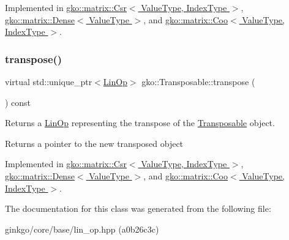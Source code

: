 Implemented in \hyperlink{classgko_1_1matrix_1_1Csr_a38820451af5424f18b767667f3067d72}{gko\+::matrix\+::\+Csr$<$ Value\+Type, Index\+Type $>$}, \hyperlink{classgko_1_1matrix_1_1Dense_a19890b1448497a50d57c16ed4c3bd820}{gko\+::matrix\+::\+Dense$<$ Value\+Type $>$}, and \hyperlink{classgko_1_1matrix_1_1Coo_ac1d91c524ca616b4c9e5f2a62f3f55ce}{gko\+::matrix\+::\+Coo$<$ Value\+Type, Index\+Type $>$}.

\mbox{\label{classgko_1_1Transposable_a5c6b778b71b47d53e0bda6ccf894d318}} 
\subsubsection{\texorpdfstring{transpose()}{transpose()}}
{\footnotesize\ttfamily virtual std\+::unique\+\_\+ptr$<$\hyperlink{classgko_1_1LinOp}{Lin\+Op}$>$ gko\+::\+Transposable\+::transpose (\begin{DoxyParamCaption}{ }\end{DoxyParamCaption}) const\hspace{0.3cm}{\ttfamily [pure virtual]}}



Returns a \hyperlink{classgko_1_1LinOp}{Lin\+Op} representing the transpose of the \hyperlink{classgko_1_1Transposable}{Transposable} object. 

\begin{DoxyReturn}{Returns}
a pointer to the new transposed object 
\end{DoxyReturn}


Implemented in \hyperlink{classgko_1_1matrix_1_1Csr_ab79e609214d6b4834d5961ee0a7d3519}{gko\+::matrix\+::\+Csr$<$ Value\+Type, Index\+Type $>$}, \hyperlink{classgko_1_1matrix_1_1Dense_a64ea8e876f5390a535a2ef486bd5ab9a}{gko\+::matrix\+::\+Dense$<$ Value\+Type $>$}, and \hyperlink{classgko_1_1matrix_1_1Coo_ae6533c08c7f818d3bdd80b2871784dab}{gko\+::matrix\+::\+Coo$<$ Value\+Type, Index\+Type $>$}.



The documentation for this class was generated from the following file\+:\begin{DoxyCompactItemize}
\item 
ginkgo/core/base/lin\+\_\+op.\+hpp (a0b26c3c)\end{DoxyCompactItemize}
